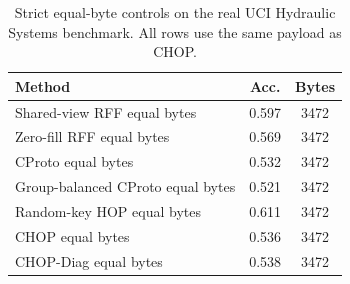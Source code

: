 \begin{table}[t]
\centering
\caption{Strict equal-byte controls on the real UCI Hydraulic Systems benchmark. All rows use the same payload as CHOP.}
\label{tab:strict-equal-byte-hydraulic}
\begin{tabular}{lcc}
\toprule
Method & Acc. & Bytes \\
\midrule
Shared-view RFF equal bytes & 0.597 & 3472 \\
Zero-fill RFF equal bytes & 0.569 & 3472 \\
CProto equal bytes & 0.532 & 3472 \\
Group-balanced CProto equal bytes & 0.521 & 3472 \\
Random-key HOP equal bytes & 0.611 & 3472 \\
CHOP equal bytes & 0.536 & 3472 \\
CHOP-Diag equal bytes & 0.538 & 3472 \\
\bottomrule
\end{tabular}
\end{table}
